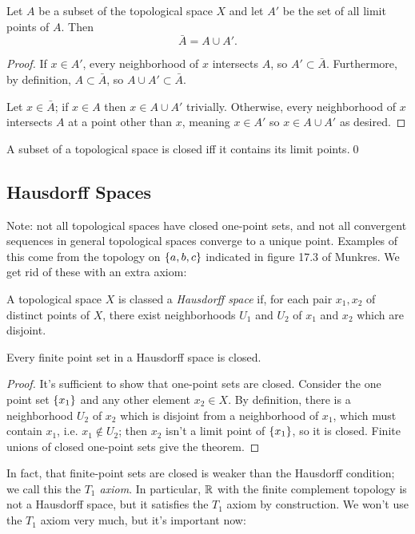 \documentclass[10pt]{report}
\begin{document}
\begin{theorem}
  Let $A$ be a subset of the topological space $X$ and let $A'$ be the set of all limit points of $A$. Then
  \[
    \bar A = A \cup A'.
  \]
\end{theorem}
\begin{proof}
  If $x \in A'$, every neighborhood of $x$ intersects $A$, so $A' \subset \bar A$.
  Furthermore, by definition, $A \subset \bar A$, so $A \cup A' \subset \bar A$.

  Let $x \in \bar A$; if $x \in A$ then $x \in A \cup A'$ trivially.
  Otherwise, every neighborhood of $x$ intersects $A$ at a point other than $x$, meaning $x \in A'$ so $x \in A \cup A'$ as desired.
\end{proof}
\begin{corollary}
  A subset of a topological space is closed iff it contains its limit points.\qed
\end{corollary}

\subsection{Hausdorff Spaces}
Note: not all topological spaces have closed one-point sets, and not all convergent sequences in general topological spaces converge to a unique point.
Examples of this come from the topology on $\left\{ a,b,c \right\}$ indicated in figure 17.3 of Munkres.
We get rid of these with an extra axiom:
\begin{definition}
  A topological space $X$ is classed a \emph{Hausdorff space} if, for each pair $x_1,x_2$ of distinct points of $X$, there exist neighborhoods $U_1$ and $U_2$ of $x_1$ and $x_2$ which are disjoint.
\end{definition}

\begin{theorem}
  Every finite point set in a Hausdorff space is closed.
\end{theorem}
\begin{proof}
  It's sufficient to show that one-point sets are closed.
  Consider the one point set $\left\{ x_1 \right\}$ and any other element $x_2 \in X$.
  By definition, there is a neighborhood $U_2$ of $x_2$ which is disjoint from a neighborhood of $x_1$, which must contain $x_1$, i.e. $x_1 \notin U_2$; then $x_2$ isn't a limit point of $\left\{ x_1 \right\}$, so it is closed.
  Finite unions of closed one-point sets give the theorem.
\end{proof}

In fact, that finite-point sets are closed is weaker than the Hausdorff condition; we call this the \emph{$T_1$ axiom}.
In particular, $\mathbb{R}$ with the finite complement topology is not a Hausdorff space, but it satisfies the $T_1$ axiom by construction.
We won't use the $T_1$ axiom very much, but it's important now:
\end{document}
